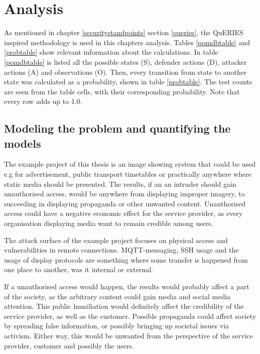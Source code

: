 \chapter{Analysis} \label{analysis}

As mentioned in chapter \ref{securitystandpoints} section \ref{queries}, the QuERIES inspired methodology is used in this chapters analysis. Tables \ref{pomdbtable} and \ref{probtable} show relevant information about the calculations. In table \ref{pomdbtable} is listed all the possible states (S), defender actions (D), attacker actions (A) and observations (O). Then, every transition from state to another state was calculated as a probability, shown in table \ref{probtable}. The test counts are seen from the table cells, with their corresponding probability. Note that every row adds up to 1.0.

\section{Modeling the problem and quantifying the models} \label{modprob}

The example project of this thesis is an image showing system that could be used e.g for advertisement, public transport timetables or practically anywhere where static media should be presented. The results, if an an intruder should gain unauthorised access, would be anywhere from displaying improper imagery, to succeeding in displaying propaganda or other unwanted content. Unauthorised access could have a negative economic effect for the service provider, as every organisation displaying media want to remain credible among users.

The attack surface of the example project focuses on physical access and vulnerabilities in remote connections. MQTT-messaging, SSH usage and the usage of display protocols are something where some transfer is happened from one place to another, was it internal or external.

If a unauthorised access would happen, the results would probably affect a part of the society, as the arbitrary content could gain media and social media attention. This public humiliation would definitely affect the credibility of the service provider, as well as the customer. Possible propaganda could affect society by spreading false information, or possibly bringing up societal issues via activism. Either way, this would be unwanted from the perspective of the service provider, customer and possibly the users.



